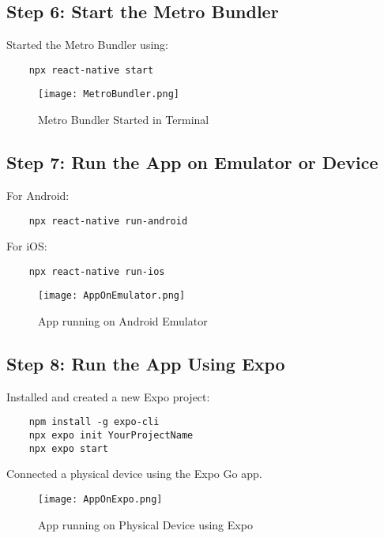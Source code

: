 \documentclass{article}
\begin{document}
\subsection{Step 6: Start the Metro Bundler}
Started the Metro Bundler using:
\begin{verbatim}
    npx react-native start
\end{verbatim}

\begin{figure}[H]
    \centering
    \texttt{[image: MetroBundler.png]}
    \caption{Metro Bundler Started in Terminal}
    \label{fig:metro_bundler}
\end{figure}

\subsection{Step 7: Run the App on Emulator or Device}
For Android:
\begin{verbatim}
    npx react-native run-android
\end{verbatim}
For iOS:
\begin{verbatim}
    npx react-native run-ios
\end{verbatim}

\begin{figure}[H]
    \centering
    \texttt{[image: AppOnEmulator.png]}
    \caption{App running on Android Emulator}
    \label{fig:emulator}
\end{figure}

\subsection{Step 8: Run the App Using Expo}
Installed and created a new Expo project:
\begin{verbatim}
    npm install -g expo-cli
    npx expo init YourProjectName
    npx expo start
\end{verbatim}
Connected a physical device using the Expo Go app.

\begin{figure}[H]
    \centering
    \texttt{[image: AppOnExpo.png]}
    \caption{App running on Physical Device using Expo}
    \label{fig:expo_device}
\end{figure}
\end{document}
